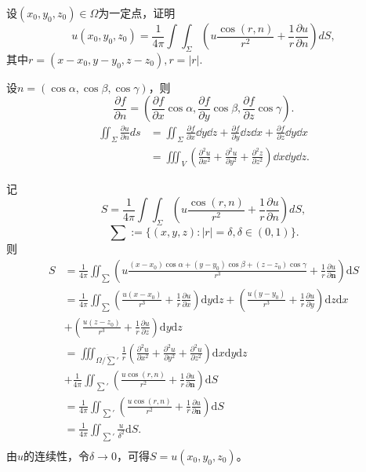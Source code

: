   \begin{solution}
  设$(x_0,y_0,z_0)\in\Omega$为一定点，证明
  $$u(x_0,y_0,z_0)=\frac1{4\pi}\int\int_{\Sigma}(u\frac{\cos(r,n)}{r^2}+\frac1r\frac{\partial u}{\partial n})dS,$$
  其中$r=(x-x_0,y-y_0,z-z_0),r=|r|.$  
  
   设$n=(\cos\alpha,\cos\beta,\cos\gamma)$，则
  $$\frac{\partial f}{\partial n}=(\frac{\partial f}{\partial x}\cos\alpha,\frac{\partial f}{\partial y}\cos\beta,\frac{\partial f}{\partial z}\cos\gamma).$$
  \begin{align*}
    \iint_{\Sigma}\frac{\partial u}{\partial n}ds
    &=\iint_{\Sigma}\frac{\partial f}{\partial x}\dd y\dd z + \frac{\partial f}{\partial y}\dd z\dd x+\frac{\partial f}{\partial z}\dd y\dd x\\
    &=\iiint_V(\frac{\partial^2u}{\partial x^2}+\frac{\partial^2u}{\partial y^2}+\frac{\partial^2z}{\partial z^2})\dd x\dd y\dd z.
  \end{align*} 
  
  记
$$S=\frac1{4\pi}\int\int_{\Sigma}(u\frac{\cos(r,n)}{r^2}+\frac1r\frac{\partial u}{\partial n})dS,$$
$$\sum:=\{(x,y,z):|r|=\delta,\delta\in(0,1)\}.$$
则
\begin{align*}
S&=\frac{1}{4\pi}\iint_{\sum}(u\frac{(x-x_0)\cos\alpha+(y-y_0)\cos\beta+(z-z_0)\cos\gamma}{r^3}+\frac{1}{r}\frac{\partial u}{\partial \textbf{n}})\mathrm{d}S\\
&=\frac{1}{4\pi}\iint_{\sum}(\frac{u(x-x_0)}{r^3}+\frac{1}{r}\frac{\partial u}{\partial x})\mathrm{d}y\mathrm{d}z
+(\frac{u(y-y_0)}{r^3}+\frac{1}{r}\frac{\partial u}{\partial y})\mathrm{d}z\mathrm{d}x\\
&+(\frac{u(z-z_0)}{r^3}+\frac{1}{r}\frac{\partial u}{\partial z})\mathrm{d}y\mathrm{d}z\\
&=\iiint_{\overline{\Omega/\sum'}}\frac{1}{r}(\frac{\partial^2u}{\partial x^2}+\frac{\partial^2u}{\partial y^2}+\frac{\partial^2u}{\partial z^2})\mathrm{d}x\mathrm{d}y\mathrm{d}z\\
&+\frac{1}{4\pi}\iint_{\sum'}(\frac{u\cos(r,n)}{r^2}+\frac{1}{r}\frac{\partial u}{\partial\textbf{n}})\mathrm{d}S\\
&=\frac{1}{4\pi}\iint_{\sum'}(\frac{u\cos(r,n)}{r^2}+\frac{1}{r}\frac{\partial u}{\partial\textbf{n}})\mathrm{d}S\\
&=\frac{1}{4\pi}\iint_{\sum'}\frac{u}{\delta^2}\mathrm{d}S.\\
\end{align*}
由$u$的连续性，令$\delta\rightarrow0$，可得$S=u(x_0,y_0,z_0)$。
  \end{solution}
 
